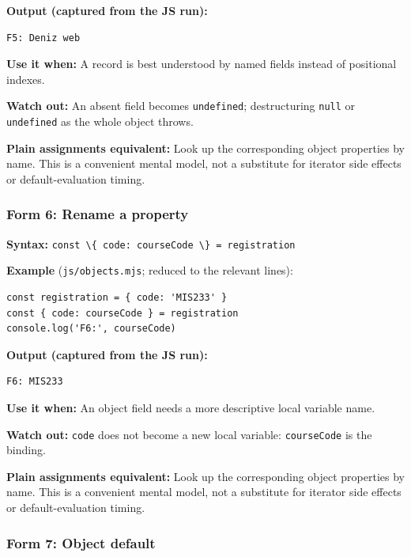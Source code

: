 \documentclass[
  10pt,
]{article}
\newcommand{\passthrough}[1]{#1}
\begin{document}
\textbf{Output (captured from the JS run):}

\begin{lstlisting}
F5: Deniz web
\end{lstlisting}

\textbf{Use it when:} A record is best understood by named fields
instead of positional indexes.

\textbf{Watch out:} An absent field becomes
\passthrough{\lstinline!undefined!}; destructuring
\passthrough{\lstinline!null!} or \passthrough{\lstinline!undefined!} as
the whole object throws.

\textbf{Plain assignments equivalent:} Look up the corresponding object
properties by name. This is a convenient mental model, not a substitute
for iterator side effects or default-evaluation timing.

\subsubsection{Form 6: Rename a
property}\label{form-6-rename-a-property}

\textbf{Syntax:}
\passthrough{\lstinline!const \{ code: courseCode \} = registration!}

\textbf{Example} (\passthrough{\lstinline!js/objects.mjs!}; reduced to
the relevant lines):

\begin{lstlisting}
const registration = { code: 'MIS233' }
const { code: courseCode } = registration
console.log('F6:', courseCode)
\end{lstlisting}

\textbf{Output (captured from the JS run):}

\begin{lstlisting}
F6: MIS233
\end{lstlisting}

\textbf{Use it when:} An object field needs a more descriptive local
variable name.

\textbf{Watch out:} \passthrough{\lstinline!code!} does not become a new
local variable: \passthrough{\lstinline!courseCode!} is the binding.

\textbf{Plain assignments equivalent:} Look up the corresponding object
properties by name. This is a convenient mental model, not a substitute
for iterator side effects or default-evaluation timing.

\subsubsection{Form 7: Object default}\label{form-7-object-default}
\end{document}
